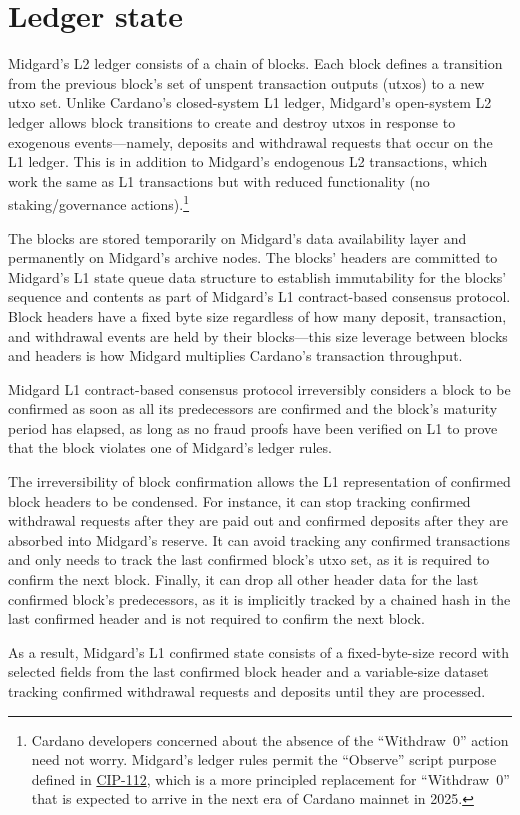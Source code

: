 \documentclass[../midgard.tex]{subfiles}
\begin{document}
\chapter{Ledger state}
\label{h:ledger-state}

Midgard's L2 ledger consists of a chain of blocks.
Each block defines a transition from the previous block's set of unspent transaction outputs (utxos) to a new utxo set.
Unlike Cardano's closed-system L1 ledger, Midgard's open-system L2 ledger allows block transitions to create and destroy utxos in response to exogenous events---namely, deposits and withdrawal requests that occur on the L1 ledger.
This is in addition to Midgard's endogenous L2 transactions, which work the same as L1 transactions but with reduced functionality (no staking/governance actions).\footnote{Cardano developers concerned about the absence of the ``Withdraw~0'' action need not worry.
Midgard's ledger rules permit the ``Observe'' script purpose defined in \href{https://github.com/cardano-foundation/CIPs/tree/master/CIP-0112}{CIP-112}, which is a more principled replacement for ``Withdraw~0'' that is expected to arrive in the next era of Cardano mainnet in 2025.}

The blocks are stored temporarily on Midgard's data availability layer and permanently on Midgard's archive nodes.
The blocks' headers are committed to Midgard's L1 state queue data structure to establish immutability for the blocks' sequence and contents as part of Midgard's L1 contract-based consensus protocol.
Block headers have a fixed byte size regardless of how many deposit, transaction, and withdrawal events are held by their blocks---this size leverage between blocks and headers is how Midgard multiplies Cardano's transaction throughput.

Midgard L1 contract-based consensus protocol irreversibly considers a block to be confirmed as soon as all its predecessors are confirmed and the block's maturity period has elapsed, as long as no fraud proofs have been verified on L1 to prove that the block violates one of Midgard's ledger rules.

The irreversibility of block confirmation allows the L1 representation of confirmed block headers to be condensed.
For instance, it can stop tracking confirmed withdrawal requests after they are paid out and confirmed deposits after they are absorbed into Midgard's reserve.
It can avoid tracking any confirmed transactions and only needs to track the last confirmed block's utxo set, as it is required to confirm the next block.
Finally, it can drop all other header data for the last confirmed block's predecessors, as it is implicitly tracked by a chained hash in the last confirmed header and is not required to confirm the next block.

As a result, Midgard's L1 confirmed state consists of a fixed-byte-size record with selected fields from the last confirmed block header and a variable-size dataset tracking confirmed withdrawal requests and deposits until they are processed.
\end{document}
